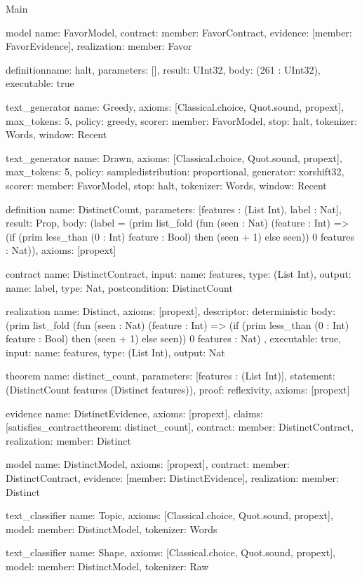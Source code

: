 \begin{lexlean}{Main}
\begin{semanticmodule}
model{
  name: FavorModel,
  contract: {member: FavorContract},
  evidence: [{member: FavorEvidence}],
  realization: {member: Favor}
}

definition{name: halt, parameters: [], result: UInt32, body: (261 : UInt32), executable: true}

text_generator{
  name: Greedy,
  axioms: [Classical.choice, Quot.sound, propext],
  max_tokens: 5,
  policy: greedy{},
  scorer: {member: FavorModel},
  stop: halt,
  tokenizer: Words,
  window: Recent
}

text_generator{
  name: Drawn,
  axioms: [Classical.choice, Quot.sound, propext],
  max_tokens: 5,
  policy: sample{distribution: proportional, generator: xorshift32},
  scorer: {member: FavorModel},
  stop: halt,
  tokenizer: Words,
  window: Recent
}

definition{
  name: DistinctCount,
  parameters: [features : (List Int), label : Nat],
  result: Prop,
  body: (label = (prim list_fold (fun (seen : Nat) (feature : Int) => (if (prim less_than (0 : Int) feature : Bool) then (seen + 1) else seen)) 0 features : Nat)),
  axioms: [propext]
}

contract{
  name: DistinctContract,
  input: {name: features, type: (List Int)},
  output: {name: label, type: Nat},
  postcondition: DistinctCount
}

realization{
  name: Distinct,
  axioms: [propext],
  descriptor: deterministic{
    body: (prim list_fold (fun (seen : Nat) (feature : Int) => (if (prim less_than (0 : Int) feature : Bool) then (seen + 1) else seen)) 0 features : Nat)
  },
  executable: true,
  input: {name: features, type: (List Int)},
  output: Nat
}

theorem{
  name: distinct_count,
  parameters: [features : (List Int)],
  statement: (DistinctCount features (Distinct features)),
  proof: reflexivity{},
  axioms: [propext]
}

evidence{
  name: DistinctEvidence,
  axioms: [propext],
  claims: [satisfies_contract{theorem: distinct_count}],
  contract: {member: DistinctContract},
  realization: {member: Distinct}
}

model{
  name: DistinctModel,
  axioms: [propext],
  contract: {member: DistinctContract},
  evidence: [{member: DistinctEvidence}],
  realization: {member: Distinct}
}

text_classifier{
  name: Topic,
  axioms: [Classical.choice, Quot.sound, propext],
  model: {member: DistinctModel},
  tokenizer: Words
}

text_classifier{
  name: Shape,
  axioms: [Classical.choice, Quot.sound, propext],
  model: {member: DistinctModel},
  tokenizer: Raw
}


\end{semanticmodule}
\end{lexlean}

